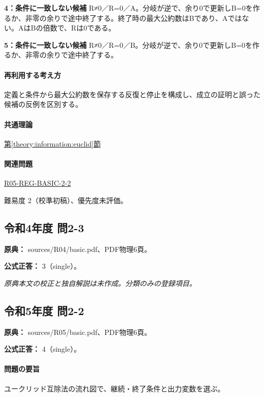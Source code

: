 \noindent\textbf{4：条件に一致しない候補} R≠0／R=\allowbreak{}0／A。分岐が逆で、余り0で更新しB=\allowbreak{}0を作るか、非零の余りで途中終了する。終了時の最大公約数はBであり、Aではない。AはBの倍数で、Rは0である。\par

\noindent\textbf{5：条件に一致しない候補} R≠0／R=\allowbreak{}0／B。分岐が逆で、余り0で更新しB=\allowbreak{}0を作るか、非零の余りで途中終了する。\par

\paragraph{再利用する考え方} 定義と条件から最大公約数を保存する反復と停止を構成し、成立の証明と誤った候補の反例を区別する。

\paragraph{共通理論} \hyperref[theory:information:euclid]{第\ref*{theory:information:euclid}節}

\paragraph{関連問題} \hyperref[q:r05-reg-basic-2-2]{R05-REG-BASIC-2-2}

\par 難易度 2（校準初稿）、優先度未評価。

\subsection{令和4年度 問2-3}
\label{q:r04-reg-basic-2-3}

\noindent\textbf{原典：} sources/R04/basic.pdf、PDF物理6頁。

\textbf{公式正答：} 3（single）。

\par\textit{原典本文の校正と独自解説は未作成。分類のみの登録項目。}

\subsection{令和5年度 問2-2}
\label{q:r05-reg-basic-2-2}

\noindent\textbf{原典：} sources/R05/basic.pdf、PDF物理6頁。

\textbf{公式正答：} 4（single）。

\paragraph{問題の要旨} ユークリッド互除法の流れ図で、継続・終了条件と出力変数を選ぶ。

